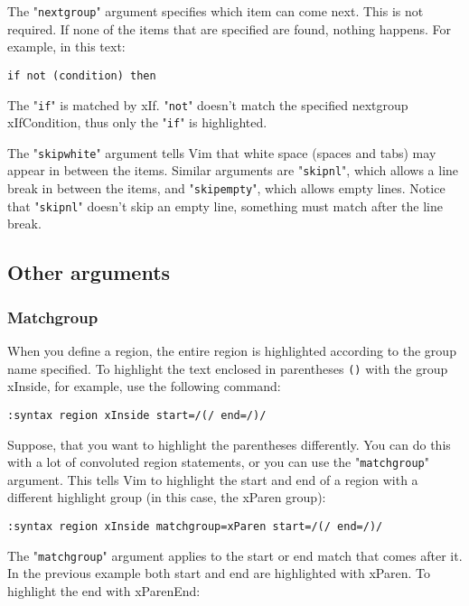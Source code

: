 The "\texttt{nextgroup}" argument specifies which item can come next.
This is not required.
If none of the items that are specified are found, nothing happens.
For example, in this text:

\begin{Verbatim}[samepage=true]
    if not (condition) then 
\end{Verbatim}

The "\texttt{if}" is matched by xIf.
"\texttt{not}" doesn't match the specified nextgroup xIfCondition, thus only the "\texttt{if}" is highlighted.

The "\texttt{skipwhite}" argument tells Vim that white space (spaces and tabs) may appear in between the items.
Similar arguments are "\texttt{skipnl}", which allows a line break in between the items, and "\texttt{skipempty}", which allows empty lines.
Notice that "\texttt{skipnl}" doesn't skip an empty line, something must match after the line break.
\subsection{Other arguments}
\subsubsection{Matchgroup}
When you define a region, the entire region is highlighted according to the group name specified.
To highlight the text enclosed in parentheses \texttt{()} with the group xInside, for example, use the following command:

\begin{Verbatim}[samepage=true]
 :syntax region xInside start=/(/ end=/)/
\end{Verbatim}

Suppose, that you want to highlight the parentheses differently.
You can do this with a lot of convoluted region statements, or you can use the "\texttt{matchgroup}" argument.
This tells Vim to highlight the start and end of a region with a different highlight group (in this case, the xParen group):

\begin{Verbatim}[samepage=true]
 :syntax region xInside matchgroup=xParen start=/(/ end=/)/
\end{Verbatim}

The "\texttt{matchgroup}" argument applies to the start or end match that comes after it.
In the previous example both start and end are highlighted with xParen.
To highlight the end with xParenEnd:

